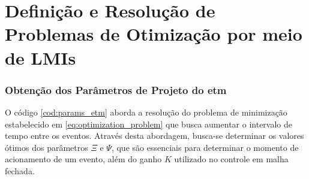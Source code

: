 \chapter{Definição e Resolução de Problemas de Otimização por meio de LMIs}\label{apendiceB}

\subsection{Obtenção dos Parâmetros de Projeto do \acrshort{etm}}

O código \ref{cod:params_etm} aborda a resolução do problema de minimização estabelecido em \eqref{eq:optimization_problem} que busca aumentar o intervalo de tempo entre os eventos. Através desta abordagem, busca-se determinar os valores ótimos dos parâmetros $\Xi$ e $\Psi$, que são essenciais para determinar o momento de acionamento de um evento, além do ganho $K$ utilizado no controle em malha fechada.

